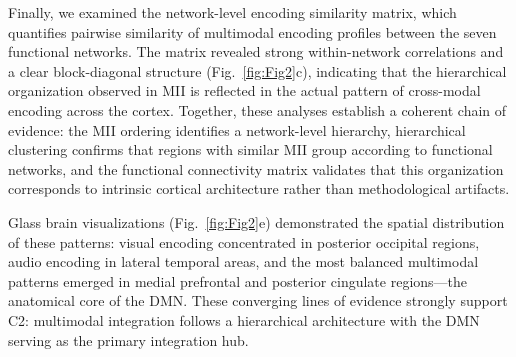 \documentclass[10pt,letterpaper]{article}
\begin{document}
Finally, we examined the network-level encoding similarity matrix, which quantifies pairwise similarity of multimodal encoding profiles between the seven functional networks. The matrix revealed strong within-network correlations and a clear block-diagonal structure (Fig.~\ref{fig:Fig2}c), indicating that the hierarchical organization observed in MII is reflected in the actual pattern of cross-modal encoding across the cortex. Together, these analyses establish a coherent chain of evidence: the MII ordering identifies a network-level hierarchy, hierarchical clustering confirms that regions with similar MII group according to functional networks, and the functional connectivity matrix validates that this organization corresponds to intrinsic cortical architecture rather than methodological artifacts.

Glass brain visualizations (Fig.~\ref{fig:Fig2}e) demonstrated the spatial distribution of these patterns: visual encoding concentrated in posterior occipital regions, audio encoding in lateral temporal areas, and the most balanced multimodal patterns emerged in medial prefrontal and posterior cingulate regions—the anatomical core of the DMN. These converging lines of evidence strongly support C2: multimodal integration follows a hierarchical architecture with the DMN serving as the primary integration hub.

\end{document}
